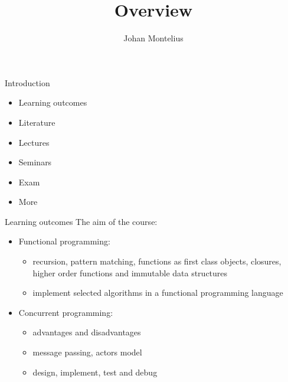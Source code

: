 

\title[ID1019 Overview]{Overview}


\author{Johan Montelius}
\date{\semester}



\begin{frame}
\titlepage
\end{frame}


\begin{frame}{Introduction}
  \begin{itemize}
    \pause \item Learning outcomes
    \pause \item Literature
    \pause \item Lectures
    \pause \item Seminars
    \pause \item Exam
    \pause \item More
  \end{itemize}
\end{frame}


\begin{frame}{Learning outcomes}
  The aim of the course:

\pause
\begin{itemize}
\item Functional programming:
\pause
  \begin{itemize}
   \item recursion, pattern matching, functions as first class objects, closures, higher order functions and immutable data structures
\pause
   \item implement selected algorithms in a functional programming language
  \end{itemize}
\pause
\item Concurrent programming:
  \begin{itemize}
\pause
    \item advantages and disadvantages
\pause
    \item message passing, actors model
\pause
    \item design, implement, test and debug 
  \end{itemize}  
\end{itemize}

\end{frame}


